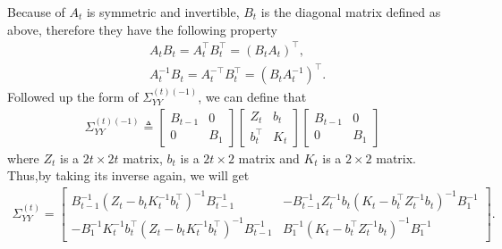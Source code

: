 Because of $A_t$ is symmetric and invertible, $B_t$ is the diagonal matrix defined as above, therefore they have the following property 
\begin{align*}
& A_tB_t=A_t^\top B_t^\top = \left(B_tA_t\right)^\top, \\
& A_t^{-1}B_t = A_t^{-\top}B_t^\top = \left(B_tA_t^{-1}\right)^\top. 
\end{align*}
Followed up the form of $\Sigma_{YY}^{(t) (-1)}$, we can define that 
\begin{align*}
\Sigma_{YY}^{(t) (-1)} \triangleq \begin{bmatrix} 
B_{t-1} & 0 \\ 0 & B_1 \end{bmatrix}
\begin{bmatrix} 
Z_{t} & b_{t} \\
b_{t}^\top & K_{t}
\end{bmatrix} \begin{bmatrix} 
B_{t-1} & 0 \\ 0 & B_1\end{bmatrix}
\end{align*}
where $Z_{t}$ is a $2t \times 2t$ matrix, $ b_{t} $ is a $2t \times 2$ matrix and $K_{t}$ is a $2 \times 2$ matrix. Thus,by taking its inverse again, we will get 
\begin{align*} 
\Sigma_{YY}^{\left(t\right)}= \begin{bmatrix}
B_{t-1}^{-1} \left(Z_{t}-b_{t}K_{t}^{-1}b_{t}^\top\right)^{-1}B_{t-1}^{-1}  & - B_{t-1}^{-1}  Z_{t}^{-1}b_{t}\left(K_{t}-b_{t}^\top Z_{t}^{-1}b_{t}\right)^{-1}B_1^{-1} \\
-B_1^{-1}  K_{t}^{-1}b_{t}^\top \left(Z_{t}-b_{t}K_{t}^{-1}b_{t}^\top\right)^{-1}B_{t-1}^{-1}  & B_1^{-1}  \left(K_{t}-b_{t}^\top Z_{t}^{-1}b_{t}\right)^{-1}B_1^{-1} 
\end{bmatrix}.
\end{align*}

